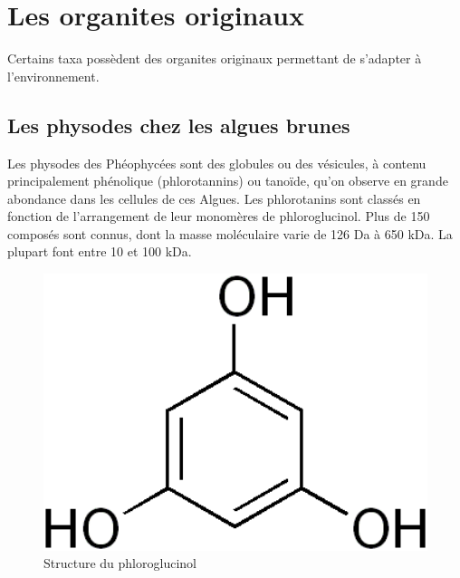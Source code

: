 \documentclass[
]{book}
\begin{document}
\hypertarget{les-organites-originaux}{%
\section{Les organites originaux}\label{les-organites-originaux}}

Certains taxa possèdent des organites originaux permettant de s'adapter à l'environnement.

\hypertarget{les-physodes-chez-les-algues-brunes}{%
\subsection{Les physodes chez les algues brunes}\label{les-physodes-chez-les-algues-brunes}}

Les physodes des Phéophycées sont des globules ou des vésicules, à contenu principalement phénolique (phlorotannins) ou tanoïde, qu'on observe en grande abondance dans les cellules de ces Algues. Les phlorotanins sont classés en fonction de l'arrangement de leur monomères de phloroglucinol. Plus de 150 composés sont connus, dont la masse moléculaire varie de 126 Da à 650 kDa. La plupart font entre 10 et 100 kDa.

\begin{figure}[H]

{\centering \includegraphics[width=4.97in]{images/Phloroglucinol_structure} 

}

\caption{Structure du phloroglucinol}\label{fig:phloroglucinol}
\end{figure}
\end{document}
